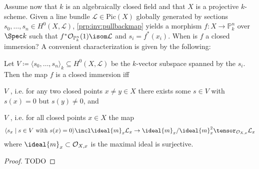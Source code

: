 \documentclass[wip, algebra]{bsteffan-lecturenotes}
\newcommand{\cO}{\mathcal{O}}
\newcommand{\cL}{\mathcal{L}}
\renewcommand{\P}{\mathbb{P}}
\newcommand{\Pic}{\mathrm{Pic}}
\begin{document}
Assume now that $k$ is an algebraically closed field and that $X$ is a projective $k$-scheme.
Given a line bundle $\cL \in \Pic(X)$ globally generated by sections $s_0, \ldots, s_n \in H^0(X, \cL)$, \cref{prp:inv:pullbackmap} yields a morphism $f\colon X \to \P^n_k$ over $\Spec k$ such that $f^* \cO_{\P^n_k}(1) \isom \cL$ and $s_i = f^*(x_i)$.
When is $f$ a closed immersion?
A convenient characterization is given by the following:
\begin{proposition}\label{prp:inv:closedimmcriterion}
	Let $V \coloneq \langle s_0, \ldots, s_n\rangle_k \subseteq H^0(X, \cL)$ be the $k$-vector subspace spanned by the $s_i$.
	Then the map $f$ is a closed immersion iff
	\begin{alphanumerate}
		\item $V$ , i.e. for any two closed points $x \neq y \in X$ there exists some $s \in V$ with $s(x) = 0$ but $s(y) \neq 0$, and
		\item $V$ , i.e. for all closed points $x \in X$ the map 
			\begin{equation*}
				\langle s_x \mid s \in V \text{ with } s(x) = 0\rangle \incl \ideal{m}_x \cL_x \to \ideal{m}_x  / \ideal{m}^2_x \tensor_{\cO_{X, x}} \cL_x
			\end{equation*}
			where $\ideal{m}_x \subset \cO_{X, x}$ is the maximal ideal is surjective.
	\end{alphanumerate}
\end{proposition}
\begin{proof}
	TODO
\end{proof}
\end{document}
